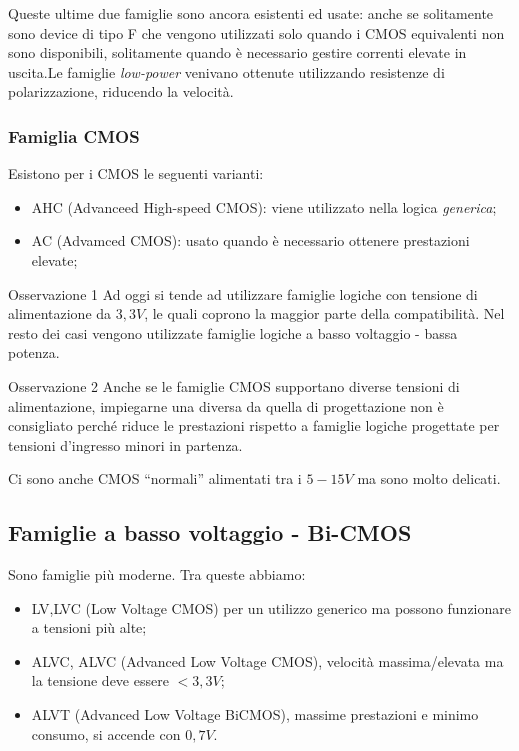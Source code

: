 \documentclass[
]{book}
\providecommand{\tightlist}{%
  \setlength{\itemsep}{0pt}\setlength{\parskip}{0pt}}
\begin{document}
Queste ultime due famiglie sono ancora esistenti ed usate: anche se
solitamente sono device di tipo F che vengono utilizzati solo quando i
CMOS equivalenti non sono disponibili, solitamente quando è necessario
gestire correnti elevate in uscita.\newline Le famiglie \emph{low-power}
venivano ottenute utilizzando resistenze di polarizzazione, riducendo la
velocità.

\subsubsection{Famiglia CMOS}\label{famiglia-cmos}

Esistono per i CMOS le seguenti varianti:

\begin{itemize}
\tightlist
\item
  AHC (Advanceed High-speed CMOS): viene utilizzato nella logica
  \emph{generica};
\item
  AC (Advamced CMOS): usato quando è necessario ottenere prestazioni
  elevate;
\end{itemize}

\begin{redbox}{Osservazione 1}
Ad oggi si tende ad utilizzare famiglie logiche con tensione di alimentazione da $3,3V$, le quali coprono la maggior parte della compatibilità. Nel resto dei casi vengono utilizzate famiglie logiche a basso voltaggio - bassa potenza.
\end{redbox}

\begin{bluebox}{Osservazione 2}
Anche se le famiglie CMOS supportano diverse tensioni di alimentazione, impiegarne una diversa da quella di progettazione non è consigliato perché riduce le prestazioni rispetto a famiglie logiche progettate per tensioni d'ingresso minori in partenza.
\end{bluebox}

Ci sono anche CMOS ``normali'' alimentati tra i \(5-15V\) ma sono molto
delicati.

\subsection{Famiglie a basso voltaggio -
Bi-CMOS}\label{famiglie-a-basso-voltaggio---bi-cmos}

Sono famiglie più moderne. Tra queste abbiamo:

\begin{itemize}
\tightlist
\item
  LV,LVC (Low Voltage CMOS) per un utilizzo generico ma possono
  funzionare a tensioni più alte;
\item
  ALVC, ALVC (Advanced Low Voltage CMOS), velocità massima/elevata ma la
  tensione deve essere \(<3,3V\);
\item
  ALVT (Advanced Low Voltage BiCMOS), massime prestazioni e minimo
  consumo, si accende con \(0,7V\).
\end{itemize}
\end{document}
